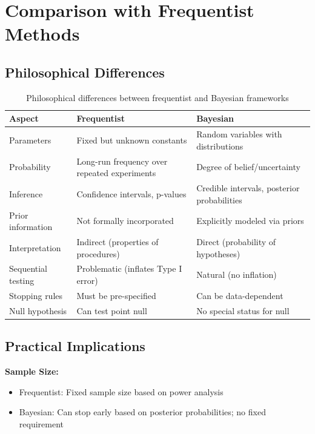 \section{Comparison with Frequentist Methods}

\subsection{Philosophical Differences}

\begin{table}[h]
\centering
\begin{tabular}{p{3cm}p{5cm}p{5cm}}
\toprule
\textbf{Aspect} & \textbf{Frequentist} & \textbf{Bayesian} \\
\midrule
Parameters & Fixed but unknown constants & Random variables with distributions \\
\midrule
Probability & Long-run frequency over repeated experiments & Degree of belief/uncertainty \\
\midrule
Inference & Confidence intervals, p-values & Credible intervals, posterior probabilities \\
\midrule
Prior information & Not formally incorporated & Explicitly modeled via priors \\
\midrule
Interpretation & Indirect (properties of procedures) & Direct (probability of hypotheses) \\
\midrule
Sequential testing & Problematic (inflates Type I error) & Natural (no inflation) \\
\midrule
Stopping rules & Must be pre-specified & Can be data-dependent \\
\midrule
Null hypothesis & Can test point null & No special status for null \\
\bottomrule
\end{tabular}
\caption{Philosophical differences between frequentist and Bayesian frameworks}
\label{tab:frequentist_vs_bayesian}
\end{table}

\subsection{Practical Implications}

\textbf{Sample Size:}
\begin{itemize}
    \item Frequentist: Fixed sample size based on power analysis
    \item Bayesian: Can stop early based on posterior probabilities; no fixed requirement
\end{itemize}

